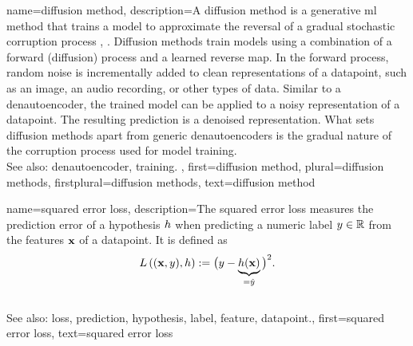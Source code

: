 {name={diffusion method},
	description={A diffusion method is a generative \gls{ml} method that
		trains a \gls{model} to approximate the reversal of a gradual \gls{stochastic}
		corruption process \cite{DeepLearningBishop}, \cite{Prince2023UnderstandingDL}. 
		Diffusion methods train \glspl{model} using a combination of a forward (diffusion) 
		process and a learned reverse \gls{map}.
		In the forward process, random noise is incrementally added to clean
		representations of a \gls{datapoint}, such as an image, an audio recording,
		or other types of \gls{data}. Similar to a \gls{denautoencoder}, the 
		trained \gls{model} can be applied to a noisy representation of a \gls{datapoint}. 
		The resulting \gls{prediction} is a denoised representation. What sets 
		diffusion methods apart from generic \glspl{denautoencoder} is the gradual 
		nature of the corruption process used for \gls{model} \gls{training}.
		\\
		See also: \gls{denautoencoder}, \gls{training}. },
	first={diffusion method},
    	plural={diffusion methods},
    	firstplural={diffusion methods},
    	text={diffusion method}
}

{name={squared error loss},
	description={The squared 
		error \gls{loss} measures the \gls{prediction} error of a 
		\gls{hypothesis} $h$ when predicting a numeric \gls{label} $y \in \mathbb{R}$ 
		from the \glspl{feature} ${\bf x}$ of a \gls{datapoint}. It is defined as 
		\begin{equation} 
			\nonumber
			L\left(({\bf x},y),h \right) := \big(y - \underbrace{h({\bf x})}_{=\hat{y}} \big)^{2}. 
		\end{equation} 
			\\ 
		See also: \gls{loss}, \gls{prediction}, \gls{hypothesis}, \gls{label}, \gls{feature}, \gls{datapoint}.},
	first={squared error loss},
	text={squared error loss}
}

